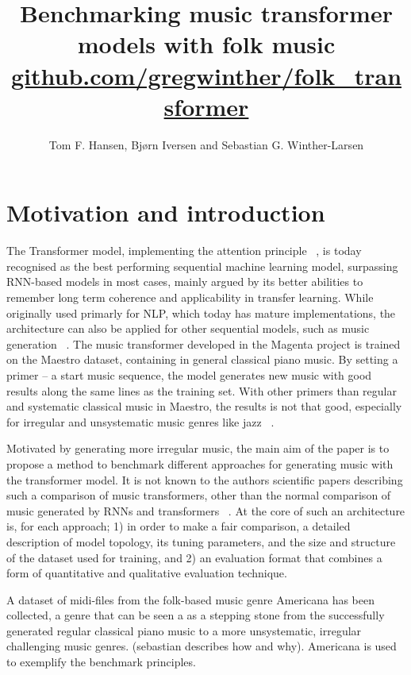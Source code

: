 \documentclass{article}
\title{Benchmarking music transformer models with folk music \\
    \normalsize{\url{github.com/gregwinther/folk_transformer}}}
\author{Tom F. Hansen, Bjørn Iversen and Sebastian G. Winther-Larsen}
\begin{document}
    \maketitle

    \section{Motivation and introduction}

        The Transformer model, implementing the attention principle ~\cite{vaswani2017attention},
        is today recognised as the best performing sequential machine learning model,
        surpassing RNN-based models in most cases, mainly argued by its better abilities
        to remember long term coherence and applicability in transfer learning.
        While originally used primarly for NLP, which today has mature implementations,
        the architecture can also be applied for other sequential models,
        such as music generation ~\cite{huang2018music}.
        The music transformer developed in the Magenta project is trained on the Maestro dataset,
        containing in general classical piano music.
        By setting a primer – a start music sequence, the model generates new music with good
        results along the same lines as the training set. With other primers than regular and
        systematic classical music in Maestro, the results is not that good, especially for
        irregular and unsystematic music genres like jazz ~\cite{wu2020jazz}.
        
        Motivated by generating more irregular music, the main aim of the paper is
        to propose a method to benchmark different approaches for generating music
        with the transformer model. It is not known to the authors scientific papers
        describing such a comparison of music transformers, other than the normal
        comparison of music generated by RNNs and transformers ~\cite{huang2018music}. At the core
        of such an architecture is, for each approach; 1) in order to make a fair comparison,
        a detailed description of model topology, its tuning parameters, and the size
        and structure of the dataset used for training, and 2) an evaluation format
        that combines a form of quantitative and qualitative evaluation technique.
        
        A dataset of midi-files from the folk-based music genre Americana has been
        collected, a genre that can be seen a as a stepping stone from the successfully
        generated regular classical piano music to a more unsystematic, irregular
        challenging music genres. (sebastian describes how and why).
        Americana is used to exemplify the benchmark principles.
\end{document}
